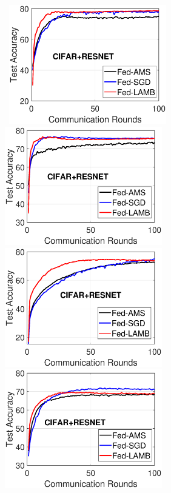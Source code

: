 \documentclass[11pt]{article}
\begin{document}
\begin{figure}[H]
    \begin{center}
        \mbox{
        \includegraphics[width=2.7in]{figure/cifar_testerror_resnet_ep1_client10_iid1_SGD.eps}
         \includegraphics[width=2.7in]{figure/cifar_testerror_resnet_ep3_client10_iid1_SGD.eps}
        }
                \mbox{
                \includegraphics[width=2.7in]{figure/cifar_testerror_resnet_ep1_client50_iid1_SGD.eps}
                        \includegraphics[width=2.7in]{figure/cifar_testerror_resnet_ep3_client50_iid1_SGD.eps}
}
\end{center}
\end{figure}
\end{document}
